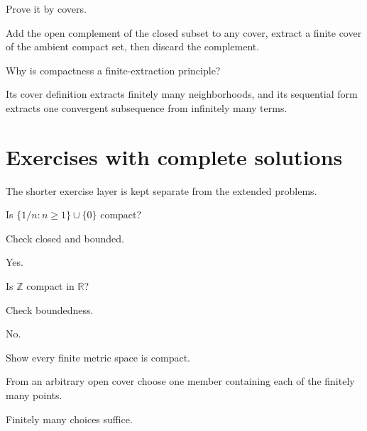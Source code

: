\begin{problem}\label{prob:ii06-problem-11}
Prove it by covers.
\end{problem}
\begin{solution}
Add the open complement of the closed subset to any cover, extract a finite cover of the ambient compact set, then discard the complement.
\end{solution}

\begin{problem}\label{prob:ii06-problem-12}
Why is compactness a finite-extraction principle?
\end{problem}
\begin{solution}
Its cover definition extracts finitely many neighborhoods, and its sequential form extracts one convergent subsequence from infinitely many terms.
\end{solution}

\section{Exercises with complete solutions}
The shorter exercise layer is kept separate from the extended problems.

\begin{exercise}\label{exr:ii06-01}
Is $\{1/n:n\ge1\}\cup\{0\}$ compact?
\end{exercise}
\begin{hint}
Check closed and bounded.
\end{hint}
\begin{solution}
Yes.
\end{solution}

\begin{exercise}\label{exr:ii06-02}
Is $\mathbb Z$ compact in $\mathbb R$?
\end{exercise}
\begin{hint}
Check boundedness.
\end{hint}
\begin{solution}
No.
\end{solution}

\begin{exercise}\label{exr:ii06-03}
Show every finite metric space is compact.
\end{exercise}
\begin{hint}
From an arbitrary open cover choose one member containing each of the finitely many points.
\end{hint}
\begin{solution}
Finitely many choices suffice.
\end{solution}

